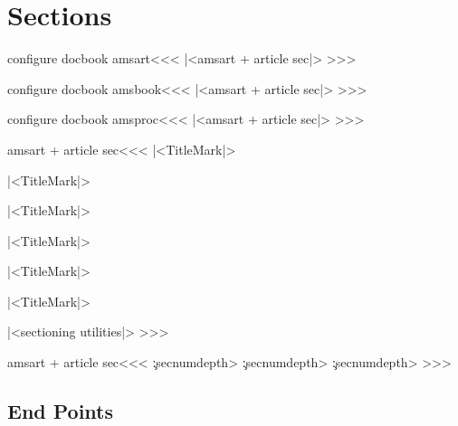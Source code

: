\section{Sections}





\<configure docbook amsart\><<<
|<amsart + article sec|>
>>>

\<configure docbook amsbook\><<<
|<amsart + article sec|>
>>>


\<configure docbook amsproc\><<<
|<amsart + article sec|>
>>>




\<amsart + article sec\><<<
   {}   {}
   {|<TitleMark|>} {\par\ShowPar}
   {}   {}
   {|<TitleMark|>}   {\par\ShowPar}
   {}   {}
   {|<TitleMark|>}   {\par\ShowPar}
   {}   {}
   {|<TitleMark|>}   {\par\ShowPar}
   {}   {}
   {|<TitleMark|>}   {\par\ShowPar}
   {}   {}
   {|<TitleMark|>}   {\par\ShowPar}
|<sectioning utilities|>
>>>


\<amsart + article sec\><<<
   {\ifnum \c:secnumdepth>\c@secnumdepth \expandafter{}
    \else {}\thesection
          \fi }
   {\ifnum \c:secnumdepth>\c@secnumdepth \expandafter{}
    \else {}\thesubsection
          \fi }
   {\ifnum \c:secnumdepth>\c@secnumdepth \expandafter{}
    \else {}\thesubsubsection
          \fi }
>>>

\subsection{End Points}



